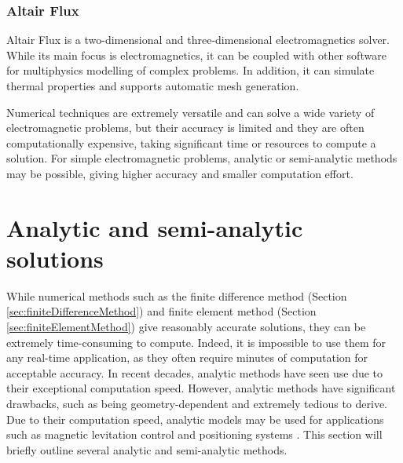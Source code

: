 \subsubsection{Altair Flux}
Altair Flux is a two-dimensional and three-dimensional electromagnetics solver. While its main focus is electromagnetics, it can be coupled with other software for multiphysics modelling of complex problems. In addition, it can simulate thermal properties and supports automatic mesh generation.

Numerical techniques are extremely versatile and can solve a wide variety of electromagnetic problems, but their accuracy is limited and they are often computationally expensive, taking significant time or resources to compute a solution. For simple electromagnetic problems, analytic or semi-analytic methods may be possible, giving higher accuracy and smaller computation effort.

\section{Analytic and semi-analytic solutions}\label{sec:analyticTechniques}
While numerical methods such as the finite difference method (Section \ref{sec:finiteDifferenceMethod}) and finite element method (Section \ref{sec:finiteElementMethod}) give reasonably accurate solutions, they can be extremely time-consuming to compute. Indeed, it is impossible to use them for any real-time application, as they often require minutes of computation for acceptable accuracy. In recent decades, analytic methods have seen use due to their exceptional computation speed. However, analytic methods have significant drawbacks, such as being geometry-dependent and extremely tedious to derive. Due to their computation speed, analytic models may be used for applications such as magnetic levitation control \cite{Kamaruzaman2021} and positioning systems \cite{Lahdo2017}. This section will briefly outline several analytic and semi-analytic methods.

